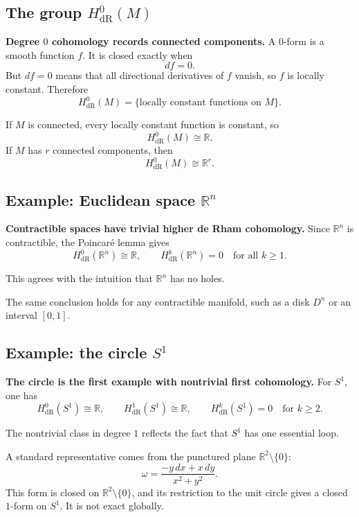 \documentclass[12pt,a4paper]{article}
\theoremstyle{notespace}
\begin{document}
\subsection{The group \(H^0_{\mathrm{dR}}(M)\)}

\textbf{Degree \(0\) cohomology records connected components.} A \(0\)-form is a smooth function \(f\). It is closed exactly when
\[
df=0.
\]
But \(df=0\) means that all directional derivatives of \(f\) vanish, so \(f\) is locally constant. Therefore
\[
H^0_{\mathrm{dR}}(M)
=
\{\text{locally constant functions on }M\}.
\]

If \(M\) is connected, every locally constant function is constant, so
\[
H^0_{\mathrm{dR}}(M)\cong \mathbb{R}.
\]
If \(M\) has \(r\) connected components, then
\[
H^0_{\mathrm{dR}}(M)\cong \mathbb{R}^r.
\]

\subsection{Example: Euclidean space \(\mathbb{R}^n\)}

\textbf{Contractible spaces have trivial higher de Rham cohomology.} Since \(\mathbb{R}^n\) is contractible, the Poincar\'e lemma gives
\[
H^0_{\mathrm{dR}}(\mathbb{R}^n)\cong \mathbb{R},
\qquad
H^k_{\mathrm{dR}}(\mathbb{R}^n)=0
\quad\text{for all }k\ge 1.
\]

This agrees with the intuition that \(\mathbb{R}^n\) has no holes.

The same conclusion holds for any contractible manifold, such as a disk \(D^n\) or an interval \([0,1]\).

\subsection{Example: the circle \(S^1\)}

\textbf{The circle is the first example with nontrivial first cohomology.} For \(S^1\), one has
\[
H^0_{\mathrm{dR}}(S^1)\cong \mathbb{R},
\qquad
H^1_{\mathrm{dR}}(S^1)\cong \mathbb{R},
\qquad
H^k_{\mathrm{dR}}(S^1)=0
\quad\text{for }k\ge 2.
\]

The nontrivial class in degree \(1\) reflects the fact that \(S^1\) has one essential loop.

A standard representative comes from the punctured plane \(\mathbb{R}^2\setminus\{0\}\):
\[
\omega=\frac{-y\,dx+x\,dy}{x^2+y^2}.
\]
This form is closed on \(\mathbb{R}^2\setminus\{0\}\), and its restriction to the unit circle gives a closed \(1\)-form on \(S^1\). It is not exact globally.
\end{document}

